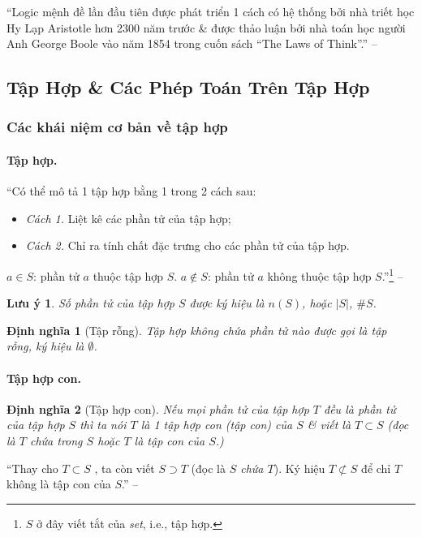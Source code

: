 \documentclass{article}
\numberwithin{equation}{section}
\newtheorem{definition}{Định nghĩa}[section]
\newtheorem{remark}{Lưu ý}[section]
\begin{document}
``Logic mệnh đề lần đầu tiên được phát triển 1 cách có hệ thống bởi nhà triết học Hy Lạp Aristotle hơn 2300 năm trước \& được thảo luận bởi nhà toán học người Anh George Boole vào năm 1854 trong cuốn sách ``The Laws of Think''.'' -- \cite[p. 11]{Khoai_Anh_Tan_Thang_Anh_Cuong_Duong_Dang_Ha_Hanh_Hong_Son_Tuan_Vuong_Toan_10_tap_1}

\subsection{Tập Hợp \& Các Phép Toán Trên Tập Hợp}

\subsubsection{Các khái niệm cơ bản về tập hợp}

\paragraph{Tập hợp.} ``Có thể mô tả 1 tập hợp bằng 1 trong 2 cách sau:
\begin{itemize}
	\item \textit{Cách 1.} Liệt kê các phần tử của tập hợp;
	\item \textit{Cách 2.} Chỉ ra tính chất đặc trưng cho các phần tử của tập hợp.
\end{itemize}
$a\in S$: phần tử $a$ thuộc tập hợp $S$. $a\notin S$: phần tử $a$ không thuộc tập hợp $S$.''\footnote{$S$ ở đây viết tắt của \textit{set}, i.e., tập hợp.} -- \cite[p. 13]{Khoai_Anh_Tan_Thang_Anh_Cuong_Duong_Dang_Ha_Hanh_Hong_Son_Tuan_Vuong_Toan_10_tap_1}

\begin{remark}
	Số phần tử của tập hợp $S$ được ký hiệu là $n(S)$, hoặc $|S|$, $\#S$.
\end{remark}

\begin{definition}[Tập rỗng]
	Tập hợp không chứa phần tử nào được gọi là \emph{tập rỗng}, ký hiệu là $\emptyset$.
\end{definition}

\paragraph{Tập hợp con.}
\begin{definition}[Tập hợp con]
	\label{def: subset}
	Nếu mọi phần tử của tập hợp $T$ đều là phần tử của tập hợp $S$ thì ta nói $T$ là 1 \emph{tập hợp con} (\emph{tập con}) của $S$ \& viết là $T\subset S$ (đọc là $T$ \emph{chứa trong} $S$ hoặc $T$ là \emph{tập con} của $S$.)
\end{definition}
``Thay cho $T\subset S$ , ta còn viết $S\supset T$ (đọc là \textit{$S$ chứa $T$}). Ký hiệu $T\not\subset S$ để chỉ $T$ không là tập con của $S$.'' -- \cite[p. 14]{Khoai_Anh_Tan_Thang_Anh_Cuong_Duong_Dang_Ha_Hanh_Hong_Son_Tuan_Vuong_Toan_10_tap_1}
\end{document}
